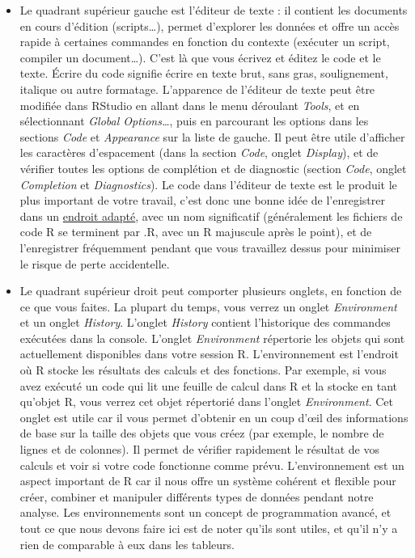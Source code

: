 \documentclass[
  french,
]{scrbook}
\providecommand{\tightlist}{%
  \setlength{\itemsep}{0pt}\setlength{\parskip}{0pt}}
\begin{document}
\begin{itemize}
\tightlist
\item
  Le quadrant supérieur gauche est l'éditeur de texte : il contient les documents en cours d'édition (scripts\ldots), permet d'explorer les données et offre un accès rapide à certaines commandes en fonction du contexte (exécuter un script, compiler un document\ldots). C'est là que vous écrivez et éditez le code et le texte. Écrire du code signifie écrire en texte brut, sans gras, soulignement, italique ou autre formatage. L'apparence de l'éditeur de texte peut être modifiée dans RStudio en allant dans le menu déroulant \emph{Tools}, et en sélectionnant \emph{Global Options\ldots{}}, puis en parcourant les options dans les sections \emph{Code} et \emph{Appearance} sur la liste de gauche. Il peut être utile d'afficher les caractères d'espacement (dans la section \emph{Code}, onglet \emph{Display}), et de vérifier toutes les options de complétion et de diagnostic (section \emph{Code}, onglet \emph{Completion} et \emph{Diagnostics}). Le code dans l'éditeur de texte est le produit le plus important de votre travail, c'est donc une bonne idée de l'enregistrer dans un \protect\hyperlink{projets}{endroit adapté}, avec un nom significatif (généralement les fichiers de code R se terminent par .R, avec un R majuscule après le point), et de l'enregistrer fréquemment pendant que vous travaillez dessus pour minimiser le risque de perte accidentelle.
\item
  Le quadrant supérieur droit peut comporter plusieurs onglets, en fonction de ce que vous faites. La plupart du temps, vous verrez un onglet \emph{Environment} et un onglet \emph{History}. L'onglet \emph{History} contient l'historique des commandes exécutées dans la console. L'onglet \emph{Environment} répertorie les objets qui sont actuellement disponibles dans votre session R. L'environnement est l'endroit où R stocke les résultats des calculs et des fonctions. Par exemple, si vous avez exécuté un code qui lit une feuille de calcul dans R et la stocke en tant qu'objet R, vous verrez cet objet répertorié dans l'onglet \emph{Environment}. Cet onglet est utile car il vous permet d'obtenir en un coup d'œil des informations de base sur la taille des objets que vous créez (par exemple, le nombre de lignes et de colonnes). Il permet de vérifier rapidement le résultat de vos calculs et voir si votre code fonctionne comme prévu. L'environnement est un aspect important de R car il nous offre un système cohérent et flexible pour créer, combiner et manipuler différents types de données pendant notre analyse. Les environnements sont un concept de programmation avancé, et tout ce que nous devons faire ici est de noter qu'ils sont utiles, et qu'il n'y a rien de comparable à eux dans les tableurs.

\end{itemize}
\end{document}
